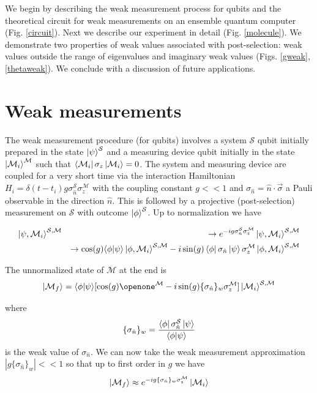 \documentclass[aps,pra,12pt,onecolumn,showpacs,superscriptaddress,floatfix,footinbib,subfigure]{revtex4}
\def\bra#1{\mathinner{\langle{#1}|}}
\def\ket#1{\mathinner{|{#1}\rangle}}
\def\es{{\mathcal{S}}}
\def\md{{\mathcal{M}}}
\def\sm{{\es,\md}}
\def\sn{ \sigma_{ \hat{n} } }
\begin{document}
 We begin by describing the weak measurement process for qubits and the theoretical circuit  for weak measurements on an ensemble quantum computer (Fig. \ref{circuit}). Next we describe our experiment in detail (Fig. \ref{molecule}). We demonstrate two properties of weak values associated with post-selection: weak values outside the range of eigenvalues and imaginary weak values (Figs. \ref{gweak}, \ref{thetaweak}). We conclude with a discussion of future applications.


\section{Weak measurements}
The weak measurement  procedure (for qubits)  \cite{Brun2008}  involves a system $\es$ qubit  initially prepared in the state $\ket{\psi}^\es$ and a measuring device qubit  initially in the state $\ket{\md_i}^\md$ such that $\bra{\md_i}\sigma_z\ket{\md_i}=0$. The system and measuring device are coupled for a very short time  via the interaction  Hamiltonian  $H_i=\delta(t-t_i)g\sn^\es\sigma_z^\md$ with the coupling constant  $g<<1$  and $\sn=\hat{n}\cdot\vec{\sigma}$ a Pauli observable in the direction $\hat{n}$.  This is followed by a projective (post-selection) measurement on $\es$ with outcome $\ket{\phi}^\es$. Up to normalization we have

\begin{eqnarray}
\ket{\psi,\md_i}^\sm&&\rightarrow e^{-ig\sn^\es\sigma_z^\md}\ket{\psi,\md_i}^\sm  \nonumber\\
&&\rightarrow \cos(g)\langle {\phi}|{\psi}\rangle \ket{\phi,\md_i}^\sm-i\sin(g)\bra{\phi}\sn\ket{\psi}\sigma_z^\md\ket{\phi,\md_i}^\sm
\end{eqnarray}

The unnormalized state of $\md$ at the end is
\begin{equation}
\ket{\md_f}=\langle {\phi}|{\psi}\rangle[ \cos(g)\openone^\md-i\sin(g)\{\sn\}_w\sigma_z^\md]\ket{\md_i}^\sm
\end{equation}

where
\begin{equation}
\label{weakvalue}
\{\sn\}_w=\frac{\bra{\phi}\sn^\es\ket{\psi}}{\langle {\phi}|{\psi}\rangle}
\end{equation}
is  the weak value of $\sn$. We can now take the weak measurement approximation $|g\{\sn\}_w|<<1$ so that up to first order in $g$ we have
\begin{equation}
\ket{\md_f}\approx e^{-ig\{\sn\}_w\sigma_z^\md}\ket{\md_i}
\end{equation}
\end{document}
